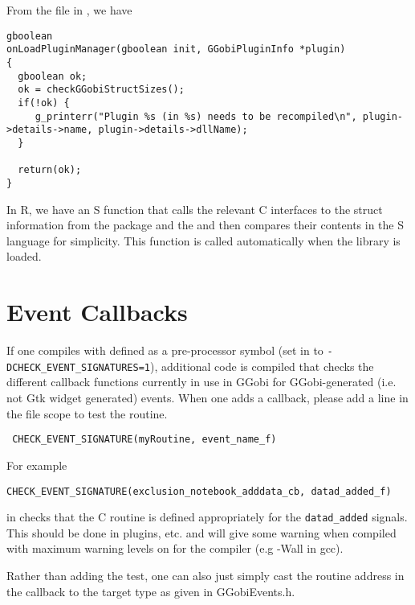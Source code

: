 \documentclass{article}
\begin{document}
\section{}

From the 
file in , we have
\begin{verbatim}
gboolean
onLoadPluginManager(gboolean init, GGobiPluginInfo *plugin)
{
  gboolean ok;
  ok = checkGGobiStructSizes();
  if(!ok) {
     g_printerr("Plugin %s (in %s) needs to be recompiled\n", plugin->details->name, plugin->details->dllName);
  }

  return(ok);
}
\end{verbatim}

In R, we have an S function that calls the relevant C interfaces to
the struct information from the  package and the
 and then compares their contents in the S
language for simplicity.  This function is called automatically when
the library is loaded.


\section{Event Callbacks}
If one compiles with  defined as a
pre-processor symbol (set  in
 to \texttt{-DCHECK_EVENT_SIGNATURES=1}),
additional code is compiled that checks the different callback
functions currently in use in GGobi for GGobi-generated (i.e. not Gtk
widget generated) events.
When one adds a callback, please add
a line in the file scope to test the routine.
\begin{verbatim}
 CHECK_EVENT_SIGNATURE(myRoutine, event_name_f)
\end{verbatim}
For example 
\begin{verbatim}
CHECK_EVENT_SIGNATURE(exclusion_notebook_adddata_cb, datad_added_f)
\end{verbatim}
in  checks that the C routine
 is defined appropriately for
the \texttt{datad_added} signals.  This should be done in plugins,
etc.  and will give some warning when compiled with maximum warning
levels on for the compiler (e.g -Wall in gcc).

Rather than adding the test, one can also just simply cast the routine
address in the callback to the target type as given in GGobiEvents.h.
\end{document}
